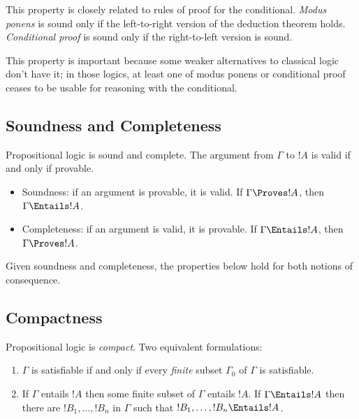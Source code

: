 \documentclass[../../../include/open-logic-section]{subfiles}
\begin{document}
This property is closely related to rules of proof for the conditional.
\emph{Modus ponens} is sound only if the left-to-right version of
the deduction theorem holds. \emph{Conditional proof} is sound only
if the right-to-left version is sound. 

This property is important because some weaker alternatives to classical
logic don't have it; in those logics, at least one of modus ponens
or conditional proof ceases to be usable for reasoning with the conditional.

\subsection{Soundness and Completeness}

\begin{thm}
    Propositional logic is sound and complete. The argument from $\Gamma$
    to $!A$ is valid if and only if provable.
    \begin{itemize}
        \item Soundness: if an argument is provable, it is valid. If
        $\Gamma \Proves !A$, then $\Gamma \Entails !A$. 
        \item Completeness: if an argument is valid, it is provable.
        If $\Gamma \Entails !A$, then $\Gamma \Proves !A$.
    \end{itemize} 
\end{thm}

Given soundness and completeness, the properties below hold for both
notions of consequence.


\subsection{Compactness}

\begin{prop}
    Propositional logic is \emph{compact}. Two equivalent formulations:
    \begin{enumerate}
        \item $\Gamma$ is satisfiable if and only if every \emph{finite} subset
    $\Gamma_0$ of $\Gamma$ is satisfiable. 
        \item If $\Gamma$ entails $!A$ then some finite subset of
        $\Gamma$ entails $!A$. If $\Gamma \Entails !A$ then there are
        $!B_1,\ldots,!B_n$ in $\Gamma$ such that $!B_1,\ldots,!B_n
        \Entails !A$.
    \end{enumerate}
\end{prop}
\end{document}
